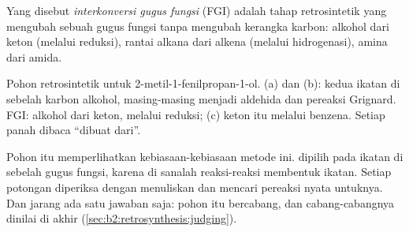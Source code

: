 \begin{definition}\label{def:b2:retrosynthesis:fgi}
Yang disebut \emph{interkonversi gugus fungsi}
(FGI) adalah tahap retrosintetik yang mengubah sebuah gugus fungsi tanpa
mengubah kerangka karbon: alkohol dari keton (melalui reduksi), rantai
alkana dari alkena (melalui hidrogenasi), amina dari amida.
\end{definition}

\begin{omfigure}
\par\vspace{6pt}

{\small Pohon retrosintetik untuk 2-metil-1-fenilpropan-1-ol. (a) dan (b):
kedua  ikatan  di sebelah karbon alkohol, masing-masing
menjadi aldehida dan pereaksi Grignard. FGI: alkohol dari keton, melalui
reduksi; (c) keton itu melalui  benzena. Setiap
panah dibaca ``dibuat dari''.}
\end{omfigure}

Pohon itu memperlihatkan kebiasaan-kebiasaan metode ini.  dipilih
pada ikatan di sebelah gugus fungsi, karena di sanalah reaksi-reaksi
membentuk ikatan. Setiap potongan diperiksa dengan menuliskan 
dan mencari pereaksi nyata untuknya. Dan jarang ada satu jawaban saja: pohon
itu bercabang, dan cabang-cabangnya dinilai di akhir
(\cref{sec:b2:retrosynthesis:judging}).


